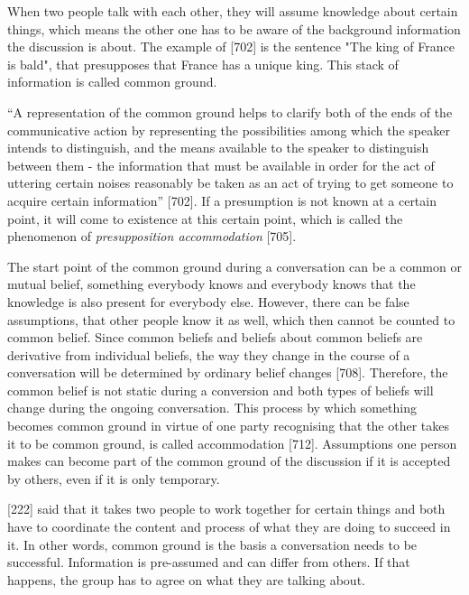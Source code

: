 When two people talk with each other, they will assume knowledge about certain things, which means the other one has to be aware of the background information the discussion is about. The example of \textcite{Stalnaker2002CommonGround}[702] is the sentence "The king of France is bald", that presupposes that France has a unique king. This stack of information is called common ground. 

``A representation of the common ground helps to clarify both of the ends of the communicative action by representing the possibilities among which the speaker intends to distinguish, and the means available to the speaker to distinguish between them - the information that must be available in order for the act of uttering certain noises reasonably be taken as an act of trying to get someone to acquire certain information'' \autocite{Stalnaker2002CommonGround}[702].
If a presumption is not known at a certain point, it will come to existence at this certain point, which is called the phenomenon of \textit{presupposition accommodation} \autocite{Stalnaker2002CommonGround}[705].

The start point of the common ground during a conversation can be a common or mutual belief, something everybody knows and everybody knows that the knowledge is also present for everybody else. However, there can be false assumptions, that other people know it as well, which then cannot be counted to common belief.
Since common beliefs and beliefs about common beliefs are derivative from individual beliefs, the way they change in the course of a conversation will be determined by ordinary belief changes \autocite{Stalnaker2002CommonGround}[708].
Therefore, the common belief is not static during a conversion and both types of beliefs will change during the ongoing conversation. This process by which something becomes common ground in virtue of one party recognising that the other takes it to be common ground, is called accommodation \autocite{Stalnaker2002CommonGround}[712]. 
Assumptions one person makes can become part of the common ground of the discussion if it is accepted by others, even if it is only temporary.


\textcite{Clark2004GroundingCommunication.}[222] said that it takes two people to work together for certain things and both have to coordinate the content and process of what they are doing to succeed in it.
In other words, common ground is the basis a conversation needs to be successful. Information is pre-assumed and can differ from others. If that happens, the group has to agree on what they are talking about.  


